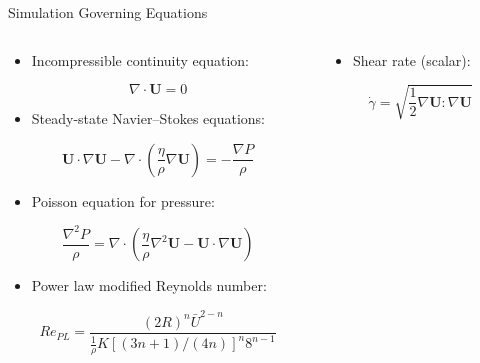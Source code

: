 \begin{frame}{\openfoam Simulation Governing Equations}

\begin{columns}
\begin{column}{.5\textwidth}

\begin{itemize}
\item Incompressible continuity equation:
\end{itemize}
\begin{equation*}
\nabla \cdot \boldsymbol{U} = 0
\end{equation*}

\begin{itemize}
\item Steady-state Navier–Stokes equations:
\end{itemize}
\begin{equation*}
\boldsymbol{U}\cdot \nabla \boldsymbol{U}-\nabla \cdot (\frac{\eta}{\rho} \nabla \boldsymbol{U})=- \frac{\nabla P}{\rho}
\end{equation*}

\begin{itemize}
\item Poisson equation for pressure:
\end{itemize}
\begin{equation*}
\frac{\nabla^2 P}{\rho} = \nabla \cdot (\frac{\eta}{\rho}\nabla^2 \boldsymbol{U}-\boldsymbol{U}\cdot \nabla \boldsymbol{U})
\end{equation*}

\begin{itemize}
\item Power law modified Reynolds number:
\end{itemize}
\vspace{0.1cm}
\begin{equation*}
Re_{PL} = \frac{(2R)^n \bar{U}^{2-n}}{\frac{1}{\rho}K[(3n+1)/(4n)]^n 8^{n-1}}
\end{equation*}
\end{column}

\begin{column}{.5\textwidth}
\begin{itemize}
\item Shear rate (scalar):
\end{itemize}
\vspace{0.1cm}
\begin{equation*}
\dot{\gamma} = \sqrt{\frac{1}{2}\nabla \boldsymbol{U} : \nabla \boldsymbol{U}}
\end{equation*}


\end{column}
\end{columns}
\end{frame}
